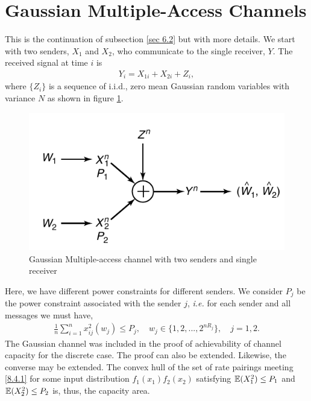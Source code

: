 \section{Gaussian Multiple-Access Channels}
This is the continuation of subsection \ref{sec 6.2} but with more details. We start with two senders, $X_1$ and $X_2$, who communicate to the single receiver, $Y$. The received signal at time $i$ is
%
\begin{eqnarray}
    Y_i = X_{1i}+X_{2i}+Z_i,
\end{eqnarray}
%
where $\{Z_i\}$ is a sequence of i.i.d., zero mean Gaussian random variables with variance $N$ as shown in figure \ref{fig:GMAC}.
%
\begin{figure}[h]
    \centering
    \includegraphics[scale=0.40]{Diagrams/GMAC.png}
    \caption{Gaussian Multiple-access channel with two senders and single receiver}
    \label{fig:GMAC}
\end{figure}
%
Here, we have different power constraints for different senders. We consider $P_j$ be the power constraint associated with the sender $j$, \textit{i.e.} for each sender and all messages we must have,
%
\begin{eqnarray}
    \frac{1}{n} \sum_{i = 1}^n x^2_{ij} (w_j) \leq P_j, \quad w_j \in \{1,2,...,2^{nR_j}\}, \quad j = 1,2.
\end{eqnarray}
%
The Gaussian channel was included in the proof of achievability of channel capacity for the discrete case. The proof can also be extended. Likewise, the converse may be extended. The convex hull of the set of rate pairings meeting \eqref{8.4.1} for some input distribution $f_1(x_1)f_2(x_2)$ satisfying $\mathbb{E}(X_1^2) \leq P_1$ and $\mathbb{E}(X_2^2) \leq P_2$ is, thus, the capacity area. 
